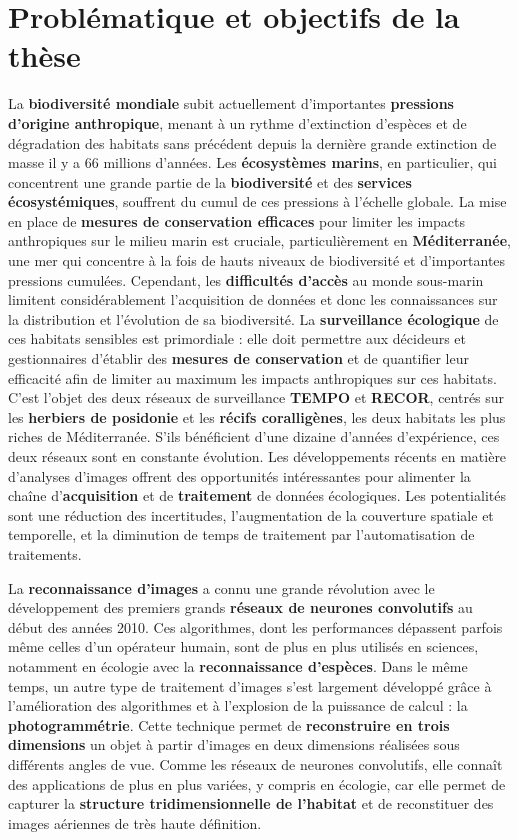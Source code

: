 \section{Problématique et objectifs de la thèse}\label{intro.3}

La \textbf{biodiversité mondiale} subit actuellement d’importantes \textbf{pressions d’origine anthropique}, menant à un rythme d’extinction d’espèces et de dégradation des habitats sans précédent depuis la dernière grande extinction de masse il y a 66 millions d’années. Les \textbf{écosystèmes marins}, en particulier, qui concentrent une grande partie de la \textbf{biodiversité} et des \textbf{services écosystémiques}, souffrent du cumul de ces pressions à l’échelle globale. La mise en place de \textbf{mesures de conservation efficaces} pour limiter les impacts anthropiques sur le milieu marin est cruciale, particulièrement en \textbf{Méditerranée}, une mer qui concentre à la fois de hauts niveaux de biodiversité et d’importantes pressions cumulées. Cependant, les \textbf{difficultés d’accès} au monde sous-marin limitent considérablement l’acquisition de données et donc les connaissances sur la distribution et l’évolution de sa biodiversité. La \textbf{surveillance écologique} de ces habitats sensibles est primordiale : elle doit permettre aux décideurs et gestionnaires d’établir des \textbf{mesures de conservation} et de quantifier leur efficacité afin de limiter au maximum les impacts anthropiques sur ces habitats. C’est l’objet des deux réseaux de surveillance \textbf{TEMPO} et \textbf{RECOR}, centrés sur les \textbf{herbiers de posidonie} et les \textbf{récifs coralligènes}, les deux habitats les plus riches de Méditerranée. S’ils bénéficient d’une dizaine d’années d’expérience, ces deux réseaux sont en constante évolution. Les développements récents en matière d’analyses d’images offrent des opportunités intéressantes pour alimenter la chaîne d’\textbf{acquisition} et de \textbf{traitement} de données écologiques. Les potentialités sont une réduction des incertitudes, l’augmentation de la couverture spatiale et temporelle, et la diminution de temps de traitement par l’automatisation de traitements.

La \textbf{reconnaissance d’images} a connu une grande révolution avec le développement des premiers grands \textbf{réseaux de neurones convolutifs} au début des années 2010. Ces algorithmes, dont les performances dépassent parfois même celles d’un opérateur humain, sont de plus en plus utilisés en sciences, notamment en écologie avec la \textbf{reconnaissance d’espèces}. Dans le même temps, un autre type de traitement d’images s’est largement développé grâce à l’amélioration des algorithmes et à l’explosion de la puissance de calcul : la \textbf{photogrammétrie}. Cette technique permet de \textbf{reconstruire en trois dimensions} un objet à partir d’images en deux dimensions réalisées sous différents angles de vue. Comme les réseaux de neurones convolutifs, elle connaît des applications de plus en plus variées, y compris en écologie, car elle permet de capturer la \textbf{structure tridimensionnelle de l’habitat} et de reconstituer des images aériennes de très haute définition.


